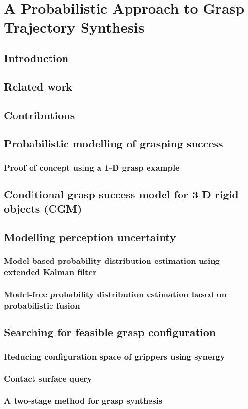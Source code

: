 \chapter{A Probabilistic Approach to Grasp Trajectory Synthesis}

\section{Introduction}

\section{Related work}

\section{Contributions}

\section{Probabilistic modelling of grasping success}


\subsection{Proof of concept using a 1-D grasp example}

\section{Conditional grasp success model for 3-D rigid objects (CGM)}

\section{Modelling perception uncertainty}

\subsection{Model-based probability distribution estimation using extended Kalman filter}


\subsection{Model-free probability distribution estimation based on probabilistic fusion}


\section{Searching for feasible grasp configuration}

\subsection{Reducing configuration space of grippers using synergy }

\subsection{Contact surface query}

\subsection{A two-stage method for grasp synthesis}







